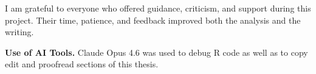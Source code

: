 I am grateful to everyone who offered guidance, criticism,
and support during this project. Their time, patience, and
feedback improved both the analysis and the writing.

\medskip
\noindent\textbf{Use of AI Tools.}
Claude Opus 4.6 was used to debug R code as well as to copy
edit and proofread sections of this thesis.
